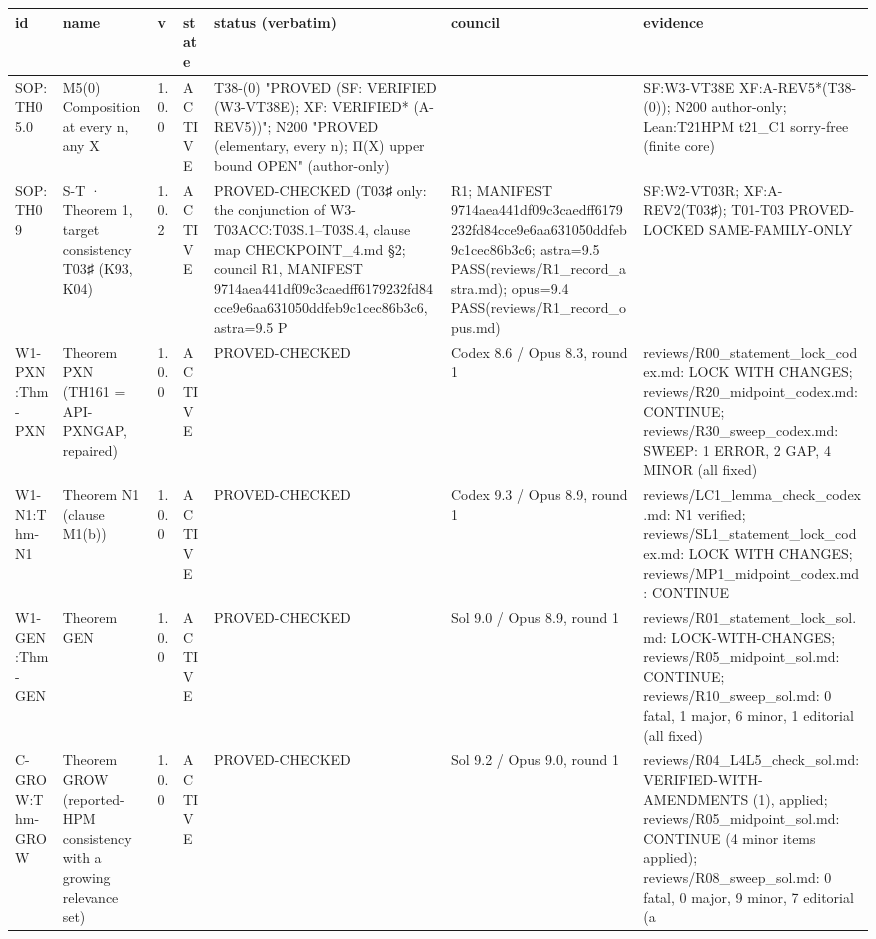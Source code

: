 \begin{longtable}{p{2.2cm}p{2.2cm}p{0.7cm}p{1.2cm}p{3.2cm}p{1.8cm}p{3cm}}
\textbf{id} & \textbf{name} & \textbf{v} & \textbf{state} & \textbf{status (verbatim)} & \textbf{council} & \textbf{evidence} \\ \hline
\endhead
SOP:TH05.0 & M5(0) Composition at every n, any X & 1.0.0 & ACTIVE & T38-(0) "PROVED (SF: VERIFIED (W3-VT38E); XF: VERIFIED* (A-REV5))"; N200 "PROVED (elementary, every n); Π(X) upper bound OPEN" (author-only) &  & SF:W3-VT38E XF:A-REV5*(T38-(0)); N200 author-only; Lean:T21HPM t21\_C1 sorry-free (finite core) \\
SOP:TH09 & S-T · Theorem 1, target consistency T03♯ (K93, K04) & 1.0.2 & ACTIVE & PROVED-CHECKED (T03♯ only: the conjunction of W3-T03ACC:T03S.1–T03S.4, clause map CHECKPOINT\_4.md §2; council R1, MANIFEST 9714aea441df09c3caedff6179232fd84cce9e6aa631050ddfeb9c1cec86b3c6, astra=9.5 P & R1; MANIFEST 9714aea441df09c3caedff6179232fd84cce9e6aa631050ddfeb9c1cec86b3c6; astra=9.5 PASS(reviews/R1\_record\_astra.md); opus=9.4 PASS(reviews/R1\_record\_opus.md) & SF:W2-VT03R; XF:A-REV2(T03♯); T01-T03 PROVED-LOCKED SAME-FAMILY-ONLY \\
W1-PXN:Thm-PXN & Theorem PXN (TH161 = API-PXNGAP, repaired) & 1.0.0 & ACTIVE & PROVED-CHECKED & Codex 8.6 / Opus 8.3, round 1 & reviews/R00\_statement\_lock\_codex.md: LOCK WITH CHANGES; reviews/R20\_midpoint\_codex.md: CONTINUE; reviews/R30\_sweep\_codex.md: SWEEP: 1 ERROR, 2 GAP, 4 MINOR (all fixed) \\
W1-N1:Thm-N1 & Theorem N1 (clause M1(b)) & 1.0.0 & ACTIVE & PROVED-CHECKED & Codex 9.3 / Opus 8.9, round 1 & reviews/LC1\_lemma\_check\_codex.md: N1 verified; reviews/SL1\_statement\_lock\_codex.md: LOCK WITH CHANGES; reviews/MP1\_midpoint\_codex.md: CONTINUE \\
W1-GEN:Thm-GEN & Theorem GEN & 1.0.0 & ACTIVE & PROVED-CHECKED & Sol 9.0 / Opus 8.9, round 1 & reviews/R01\_statement\_lock\_sol.md: LOCK-WITH-CHANGES; reviews/R05\_midpoint\_sol.md: CONTINUE; reviews/R10\_sweep\_sol.md: 0 fatal, 1 major, 6 minor, 1 editorial (all fixed) \\
C-GROW:Thm-GROW & Theorem GROW (reported-HPM consistency with a growing relevance set) & 1.0.0 & ACTIVE & PROVED-CHECKED & Sol 9.2 / Opus 9.0, round 1 & reviews/R04\_L4L5\_check\_sol.md: VERIFIED-WITH-AMENDMENTS (1), applied; reviews/R05\_midpoint\_sol.md: CONTINUE (4 minor items applied); reviews/R08\_sweep\_sol.md: 0 fatal, 0 major, 9 minor, 7 editorial (a \\

\end{longtable}
